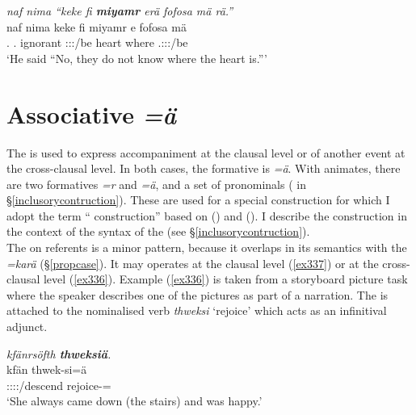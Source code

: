\begin{exe}
	\ex \emph{naf nima ``keke fi \textbf{miyamr} erä fofosa mä rä.''}\\
	\gll naf nima keke fi miyamr e fofosa mä \\
	\Tsg.\Erg{} \Quot{} \Neg{} \Third.\Abs{} ignorant \Stpl:\Sbj:\Nonpast:\Ipfv/be heart where \Tsg.\F:\Sbj:\Nonpast:\Ipfv/be\\
	\trans `He said ``No, they do not know where the heart is.'''\\
	\label{ex356}
\end{exe}%

\section{Associative \emph{=ä}} \label{comcase}

The   is used to express accompaniment at the clausal level or  of another event at the cross-clausal level. In both cases, the formative is \emph{=ä}. With animates, there are two formatives \emph{=r} and \emph{=ä}, and a set of pronominals ( in \S{}\ref{inclusorycontruction}). These are used for a special construction for which I adopt the term `` construction'' based on (\citealt{Lichtenberk:2000hr}) and (\citealt{Singer:inclu}). I describe the  construction in the context of the syntax of the  (see \S{}\ref{inclusorycontruction}).\\  

The   on  referents is a minor pattern, because it overlaps in its semantics with the   \emph{=karä} (\S{}\ref{propcase}). It may operates at the clausal level (\ref{ex337}) or at the cross-clausal level (\ref{ex336}). Example (\ref{ex336}) is taken from a storyboard picture task where the speaker describes one of the pictures as part of a narration. The  is attached to the nominalised verb \emph{thweksi} `rejoice' which acts as an infinitival adjunct. 

\begin{exe}
	\ex \emph{kfänrsöfth \textbf{thweksiä}.}\\
	\gll kfän thwek-si=ä\\
	\Stsg:\Sbj:\Pst:\Iter:\Venit/descend rejoice-\Nmlz=\Assoc{}\\
	\trans `She always came down (the stairs) and was happy.'
	\label{ex336}
\end{exe}

